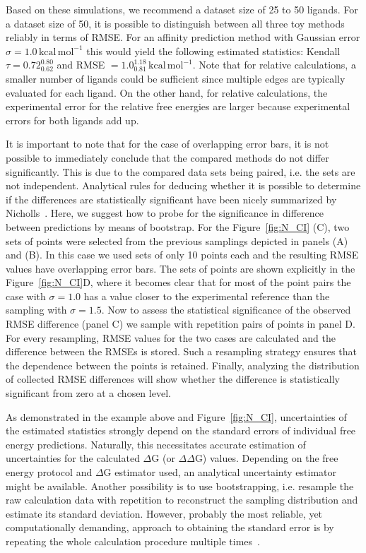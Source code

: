 \documentclass[9pt,bestpractices,pubversion]{livecoms}
\begin{document}
Based on these simulations, we recommend a dataset size of 25 to 50 ligands. For a dataset size of 50, it is possible to distinguish between all three toy methods reliably in terms of RMSE. For an affinity prediction method with Gaussian error $\sigma = 1.0\,\mathrm{kcal\,mol^{-1}}$ this would yield the following estimated statistics: Kendall $\tau = 0.72_{0.62}^{0.80}$ and RMSE $= 1.0_{0.81}^{1.18}\,\mathrm{kcal\,mol^{-1}}$. Note that for relative calculations, a smaller number of ligands could be sufficient since multiple edges are typically evaluated for each ligand. On the other hand, for relative calculations, the experimental error for the relative free energies are larger because experimental errors for both ligands add up.

It is important to note that for the case of overlapping error bars, it is not possible to immediately conclude that the compared methods do not differ significantly. This is due to the compared data sets being paired, i.e. the sets are not independent. Analytical rules for deducing whether it is possible to determine if the differences are statistically significant have been nicely summarized by Nicholls~\cite{nicholls2016part2}. Here, we suggest how to probe for the significance in difference between predictions by means of bootstrap. For the Figure~\ref{fig:N_CI} (C), two sets of points were selected from the previous samplings depicted in panels (A) and (B). In this case we used sets of only 10 points each and the resulting RMSE values have overlapping error bars. The sets of points are shown explicitly in the Figure~\ref{fig:N_CI}D, where it becomes clear that for most of the point pairs the case with $\sigma=1.0$ has a value closer to the experimental reference than the sampling with $\sigma=1.5$. Now to assess the statistical significance of the observed RMSE difference (panel C) we sample with repetition pairs of points in panel D. For every resampling, RMSE values for the two cases are calculated and the difference between the RMSEs is stored. Such a resampling strategy ensures that the dependence between the points is retained. Finally, analyzing the distribution of collected RMSE differences will show whether the difference is statistically significant from zero at a chosen level.

As demonstrated in the example above and Figure~\ref{fig:N_CI}, uncertainties of the estimated statistics strongly depend on the standard errors of individual free energy predictions. Naturally, this necessitates accurate estimation of uncertainties for the calculated $\Delta$G (or $\Delta\Delta$G) values. Depending on the free energy protocol and $\Delta$G estimator used, an analytical uncertainty estimator might be available. Another possibility is to use bootstrapping, i.e. resample the raw calculation data with repetition to reconstruct the sampling distribution and estimate its standard deviation. However, probably the most reliable, yet computationally demanding, approach to obtaining the standard error is by repeating the whole calculation procedure multiple times~\cite{knapp2018replicas,gapsys2020replicas,wan2021uncertainty}.
\end{document}
